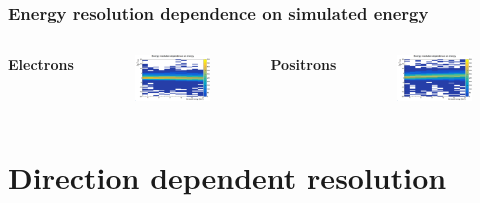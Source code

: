 \documentclass{beamer}
\begin{document}
	\begin{frame}
		\frametitle{Energy resolution dependence on simulated energy}
		\begin{columns}
			\centering
			\Large \textbf{Electrons}
			\begin{figure}
				\centering
				\includegraphics[width = 0.95 \linewidth]{../images/e_deltaenergy_energy_all.png}
			\end{figure}
			\centering
			\Large \textbf{Positrons}
			\begin{figure}
				\centering
				\includegraphics[width = 0.95 \linewidth]{../images/p_deltaenergy_energy_all.png}
			\end{figure}
		\end{columns}
	\end{frame}
	
	\section{Direction dependent resolution}
	
\end{document}
